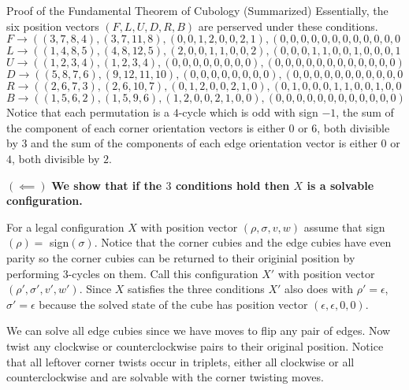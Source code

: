 \documentclass[final]{beamer}
\newlength{\colwidth}
\begin{document}
\begin{frame}[t]
\begin{columns}[t]
\begin{column}{\colwidth}
\begin{block}{Proof of the Fundamental Theorem of Cubology (Summarized)}
Essentially, the six position vectors $(F,L,U,D,R,B)$ are perserved under these conditions.
$$F \rightarrow ((3, 7, 8, 4), (3, 7, 11, 8), (0, 0, 1, 2, 0, 0, 2, 1), (0, 0, 0, 0, 0, 0, 0, 0, 0, 0, 0, 0))$$
$$L \rightarrow ((1 ,4,8,5),(4,8,12,5),(2, 0, 0, 1, 1, 0, 0, 2), (0, 0, 0, 1, 1, 0, 0, 1, 0, 0, 0, 1))$$
$$U \rightarrow ((1, 2, 3, 4), (1, 2, 3, 4), (0, 0, 0, 0, 0, 0, 0, 0), (0, 0, 0, 0, 0, 0, 0, 0, 0, 0, 0, 0))$$
$$D \rightarrow ((5, 8, 7, 6), (9, 12, 11, 10), (0, 0, 0, 0, 0, 0, 0, 0), (0, 0, 0, 0, 0, 0, 0, 0, 0, 0, 0, 0))$$
$$R \rightarrow ((2,6,7,3),(2,6,10,7),(0,1,2,0,0,2,1,0),(0,1,0,0,0,1,1,0,0,1,0,0))$$
$$B \rightarrow ((1, 5, 6, 2), (1, 5, 9, 6), (1, 2, 0, 0, 2, 1, 0, 0), (0, 0, 0, 0, 0, 0, 0, 0, 0, 0, 0, 0))$$
Notice that each permutation is a $4$-cycle which is odd with sign $-1$, the sum of the component of each corner orientation vectors is either $0$ or $6$, both divisible by $3$ and
the sum of the components of each edge orientation vector is either $0$ or $4$, both divisible by $2$.

$(\impliedby)$
\textbf{We show that if the $3$ conditions hold then $X$ is a solvable configuration.}

For a legal configuration $X$ with position vector $(\rho, \sigma, v, w)$ assume that sign$(\rho)=$ sign$(\sigma)$.
Notice that the corner cubies and the edge cubies have even parity so the corner cubies can be returned to their originial position by performing $3$-cycles on them.
Call this configuration $X'$ with position vector $(\rho', \sigma', v', w')$.
Since $X$ satisfies the three conditions $X'$ also does with $\rho' = \epsilon$, $\sigma' = \epsilon$ because the solved state of the cube has position vector $(\epsilon, \epsilon, 0 , 0)$.

We can solve all edge cubies since we have moves to flip any pair of edges.
Now twist any clockwise or counterclockwise pairs to their original position.
Notice that all leftover corner twists occur in triplets, either all clockwise or all counterclockwise and are solvable with the corner twisting moves.


  \end{block}



\end{column}
\end{columns}
\end{frame}
\end{document}
